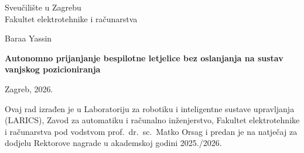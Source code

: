 \documentclass[12pt,a4paper]{report}
\newcommand{\naslovrada}{Autonomno prijanjanje bespilotne letjelice bez oslanjanja na sustav vanjskog pozicioniranja}
\newcommand{\imeprezime}{Baraa Yassin}
\newcommand{\mentor}{prof.\ dr.\ sc.\ Matko Orsag}
\newcommand{\ustrojbenajedinica}{Laboratoriju za robotiku i inteligentne sustave upravljanja (LARICS), Zavod za automatiku i računalno inženjerstvo, Fakultet elektrotehnike i računarstva}
\newcommand{\akgod}{2025./2026.}
\begin{document}
\pagestyle{empty}

\begin{titlepage}
\begin{center}
Sveučilište u Zagrebu\\
Fakultet elektrotehnike i računarstva

\vfill

{\Large \imeprezime}

\vspace{1cm}

{\Large \bfseries \naslovrada}

\vfill

Zagreb, 2026.
\end{center}
\end{titlepage}

\thispagestyle{empty}
\vspace*{6cm}
\noindent
Ovaj rad izrađen je u \ustrojbenajedinica{} pod vodstvom \mentor{} i predan je na natječaj za dodjelu Rektorove nagrade u akademskoj godini \akgod{}

\newpage

\end{document}
